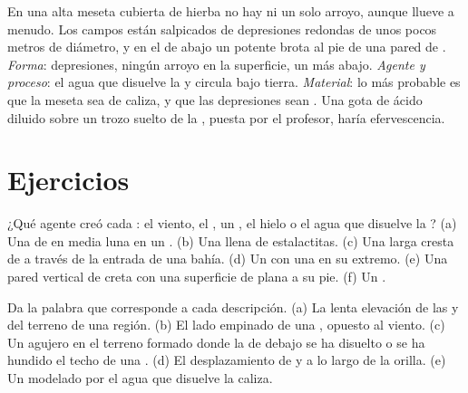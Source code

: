 \begin{example}
En una alta meseta cubierta de hierba no hay ni un solo arroyo, aunque
llueve a menudo. Los campos están salpicados de depresiones redondas de
unos pocos metros de diámetro, y en el  de abajo un potente 
brota al pie de una pared de . \emph{Forma}: depresiones, ningún arroyo
en la superficie, un  más abajo. \emph{Agente y proceso}: el agua
que disuelve la  y circula bajo tierra. \emph{Material}: lo más
probable es que la meseta sea de caliza, y que las depresiones sean
. Una gota de ácido diluido sobre un trozo suelto de la ,
puesta por el profesor, haría efervescencia.
\end{example}

\section{Ejercicios}

\begin{exercise}[$\star$]\label{exo:g9:landforms:1}
¿Qué agente creó cada : el viento, el , un , el
hielo o el agua que disuelve la ? (a) Una  de  en media luna
en un . (b) Una  llena de estalactitas. (c) Una larga cresta
de  a través de la entrada de una bahía. (d) Un  con una
 en su extremo. (e) Una pared vertical de creta con una superficie
de  plana a su pie. (f) Un .
\end{exercise}

\begin{exercise}[$\star$]\label{exo:g9:landforms:2}
Da la palabra que corresponde a cada descripción. (a) La lenta elevación de
las  y del terreno de una región. (b) El lado empinado de una ,
opuesto al viento. (c) Un agujero en el terreno formado donde la  de
debajo se ha disuelto o se ha hundido el techo de una . (d) El
desplazamiento de  y  a lo largo de la orilla. (e) Un 
modelado por el agua que disuelve la caliza.
\end{exercise}

